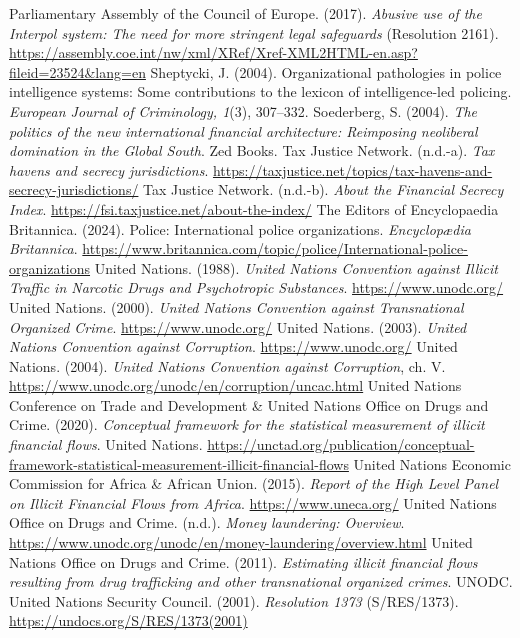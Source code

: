 \begin{referencelist}
   Parliamentary Assembly of the Council of Europe. (2017). \emph{Abusive use of the Interpol system: The need for more stringent legal safeguards} (Resolution 2161). \url{https://assembly.coe.int/nw/xml/XRef/Xref-XML2HTML-en.asp?fileid=23524&lang=en}
   Sheptycki, J. (2004). Organizational pathologies in police intelligence systems: Some contributions to the lexicon of intelligence-led policing. \emph{European Journal of Criminology, 1}(3), 307–332.
   Soederberg, S. (2004). \emph{The politics of the new international financial architecture: Reimposing neoliberal domination in the Global South}. Zed Books.
   Tax Justice Network. (n.d.-a). \emph{Tax havens and secrecy jurisdictions}. \url{https://taxjustice.net/topics/tax-havens-and-secrecy-jurisdictions/}
   Tax Justice Network. (n.d.-b). \emph{About the Financial Secrecy Index}. \url{https://fsi.taxjustice.net/about-the-index/}
   The Editors of Encyclopaedia Britannica. (2024). Police: International police organizations. \emph{Encyclopædia Britannica}. \url{https://www.britannica.com/topic/police/International-police-organizations}
   United Nations. (1988). \emph{United Nations Convention against Illicit Traffic in Narcotic Drugs and Psychotropic Substances}. \url{https://www.unodc.org/}
   United Nations. (2000). \emph{United Nations Convention against Transnational Organized Crime}. \url{https://www.unodc.org/}
   United Nations. (2003). \emph{United Nations Convention against Corruption}. \url{https://www.unodc.org/}
   United Nations. (2004). \emph{United Nations Convention against Corruption}, ch. V. \url{https://www.unodc.org/unodc/en/corruption/uncac.html}
   United Nations Conference on Trade and Development \& United Nations Office on Drugs and Crime. (2020). \emph{Conceptual framework for the statistical measurement of illicit financial flows}. United Nations. \url{https://unctad.org/publication/conceptual-framework-statistical-measurement-illicit-financial-flows}
   United Nations Economic Commission for Africa \& African Union. (2015). \emph{Report of the High Level Panel on Illicit Financial Flows from Africa}. \url{https://www.uneca.org/}
   United Nations Office on Drugs and Crime. (n.d.). \emph{Money laundering: Overview}. \url{https://www.unodc.org/unodc/en/money-laundering/overview.html}
   United Nations Office on Drugs and Crime. (2011). \emph{Estimating illicit financial flows resulting from drug trafficking and other transnational organized crimes}. UNODC.
   United Nations Security Council. (2001). \emph{Resolution 1373} (S/RES/1373). \url{https://undocs.org/S/RES/1373(2001)}

\end{referencelist}
